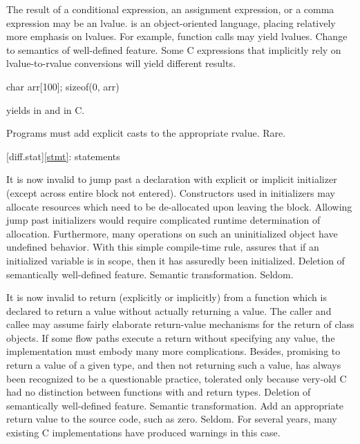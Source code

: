 %
%
%
\change
The result of a conditional expression, an assignment expression, or a comma expression may be an lvalue.
\rationale
\Cpp{} is an object-oriented language, placing relatively
more emphasis on lvalues.  For example, function calls may
yield lvalues.
\effect
Change to semantics of well-defined feature.  Some C
expressions that implicitly rely on lvalue-to-rvalue
conversions will yield different results.
\begin{example}
\begin{codeblock}
char arr[100];
sizeof(0, arr)
\end{codeblock}
yields
in \Cpp{} and
in C.
\end{example}
\difficulty
Programs must add explicit casts to the appropriate rvalue.
\howwide
Rare.

[diff.stat]{\ref*{stmt}: statements}

\change
It is now invalid to jump past a declaration with explicit or implicit initializer (except across entire block not entered).
\rationale
Constructors used in initializers may allocate
resources which need to be de-allocated upon leaving the
block.
Allowing jump past initializers would require
complicated runtime determination of allocation.
Furthermore, many operations on such an uninitialized object
have undefined behavior.
With this simple compile-time rule, \Cpp{} assures that
if an initialized variable is in scope, then it has assuredly been
initialized.
\effect
Deletion of semantically well-defined feature.
\difficulty
Semantic transformation.
\howwide
Seldom.

\change
It is now invalid to return (explicitly or implicitly) from a function which is
declared to return a value without actually returning a value.
\rationale
The caller and callee may assume fairly elaborate
return-value mechanisms for the return of class objects.
If
some flow paths execute a return without specifying any value,
the implementation must embody many more complications.
Besides,
promising to return a value of a given type, and then not returning
such a value, has always been recognized to be a questionable
practice, tolerated only because very-old C had no distinction between
functions with  and  return types.
\effect
Deletion of semantically well-defined feature.
\difficulty
Semantic transformation.
Add an appropriate return value to the source code, such as zero.
\howwide
Seldom.
For several years, many existing C implementations have produced warnings in
this case.

